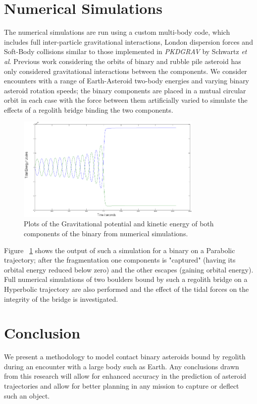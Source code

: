 \documentclass[letterpaper, preprint, paper,11pt]{AAS}	%
\begin{document}
\section{Numerical Simulations}
The numerical simulations are run using a custom multi-body code, which includes full inter-particle gravitational interactions, London dispersion forces and Soft-Body collisions similar to those implemented in \textit{PKDGRAV} by Schwartz \textit{et al}\cite{soft}.
Previous work considering the orbits of binary and rubble pile asteroid has only considered gravitational interactions between the components. We consider encounters with a range of Earth-Asteroid two-body energies and varying binary asteroid rotation speeds; the binary components are placed in a mutual circular orbit in each case with the force between them artificially varied to simulate the effects of a regolith bridge binding the two components.
\begin{figure}[H]
\centering
\includegraphics[width=0.8\textwidth]{binary_num.png} 
\caption{Plots of the Gravitational potential and kinetic energy of both components of the binary from numerical simulations.} 
\label{fig:Num}
\end{figure}
 Figure ~\ref{fig:Num} shows the output of such a simulation for a binary on a Parabolic trajectory; after the fragmentation one components is "captured" (having its orbital energy reduced below zero) and the other escapes (gaining orbital energy).  
Full numerical simulations of two boulders bound by such a regolith bridge on a Hyperbolic trajectory are also performed and the effect of the tidal forces on the integrity of the bridge is investigated.


\section{Conclusion}
We present a methodology to model contact binary asteroids bound by regolith during an encounter with a large body such as Earth. Any conclusions drawn from this research will allow for enhanced accuracy in the prediction of asteroid trajectories and allow for better planning in any mission to capture or deflect such an object.

\end{document}
